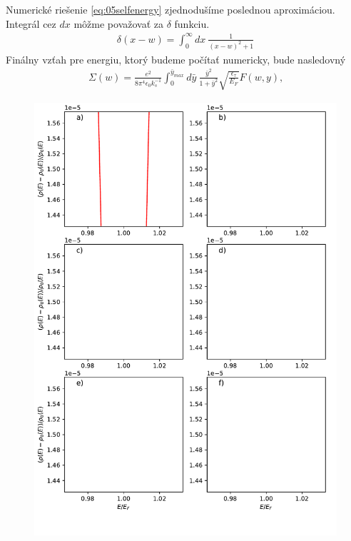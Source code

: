 Numerické riešenie \eqref{eq:05selfenergy} zjednodušíme poslednou aproximáciou. Integrál cez $dx$ môžme považovať za $\delta$ funkciu.
\begin{align}
\delta(x-w)=\int_0^{\infty}dx\ \frac{1}{(x-w)^2+1}
\end{align}
Finálny vzťah pre energiu, ktorý budeme počítať numericky, bude nasledovný
\begin{align}
\label{eq:05selfenergy2}
\Sigma(w)=\frac{e^2}{8\pi^4\epsilon_0 k_s^{-1}} \int_0^{\bar y_{max}} d\bar{y}\ \frac{\bar{y}^2}{1+\bar{y}^2}\sqrt{\frac{\epsilon_\tau}{E_F}}F(w,y) \text{,}
\end{align} 
\begin{figure}
\includegraphics[scale=0.9]{../img/final_data_1k.pdf}
\caption{\lipsum[3]}
\end{figure}